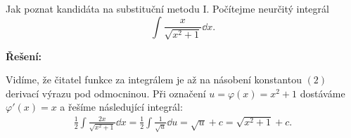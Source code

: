 \begin{mdframed}[style=mdexam]
  \begin{example}\label{MAI:exam110}
    Jak poznat kandidáta na substituční metodu I. Počítejme neurčitý integrál 
    \begin{equation*}
      \int\frac{x}{\sqrt{x^2+1}}\dd{x}.
    \end{equation*} 

    \noindent\textbf{Řešení:}

    Vidíme, že čitatel funkce za integrálem je až na násobení konstantou \((2)\) derivací výrazu pod
    odmocninou. Při označení \(u=\varphi(x) = x^2 + 1\) dostáváme \(\varphi'(x) = x\) a řešíme
    následující integrál:
    \begin{gather*}
      \frac{1}{2}\int\frac{2x}{\sqrt{x^2+1}}\dd{x} 
        = \frac{1}{2}\int\frac{1}{\sqrt{u}}\dd{u} = \sqrt{u} + c    
        = \sqrt{x^2 + 1} + c.  
    \end{gather*}
  \end{example}
\end{mdframed}